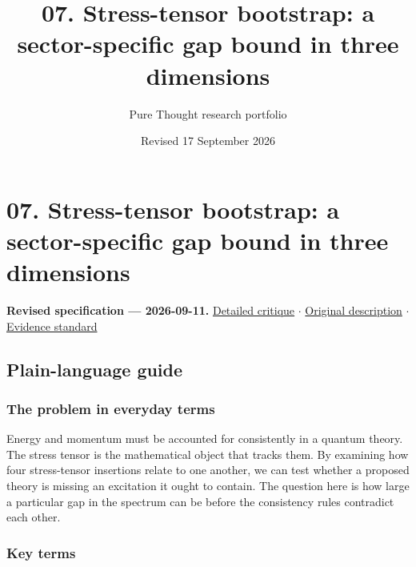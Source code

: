 \documentclass[
  11pt,
]{article}
\title{07. Stress-tensor bootstrap: a sector-specific gap bound in three
dimensions}
\author{Pure Thought research portfolio}
\date{Revised 17 September 2026}
\begin{document}
\maketitle
\thispagestyle{empty}
\clearpage

\section{07. Stress-tensor bootstrap: a sector-specific gap bound in
three dimensions}

\textbf{Revised specification --- 2026-09-11.}
\href{https://github.com/rick-stevens-ai/Pure-Thought/blob/main/reviews/07-Extremal-CFTs-Stress-Tensor.md}{Detailed
critique} \ensuremath{\cdot}
\href{https://github.com/rick-stevens-ai/Pure-Thought/blob/main/archive/original-PRDs/07-Extremal-CFTs-Stress-Tensor.md}{Original
description} \ensuremath{\cdot}
\href{https://github.com/rick-stevens-ai/Pure-Thought/blob/main/reviews/EVIDENCE-STANDARD.md}{Evidence
standard}

\subsection{Plain-language guide}

\subsubsection{The problem in everyday terms}

Energy and momentum must be accounted for consistently in a quantum
theory. The stress tensor is the mathematical object that tracks them.
By examining how four stress-tensor insertions relate to one another, we
can test whether a proposed theory is missing an excitation it ought to
contain. The question here is how large a particular gap in the spectrum
can be before the consistency rules contradict each other.

\subsubsection{Key terms}
\end{document}
